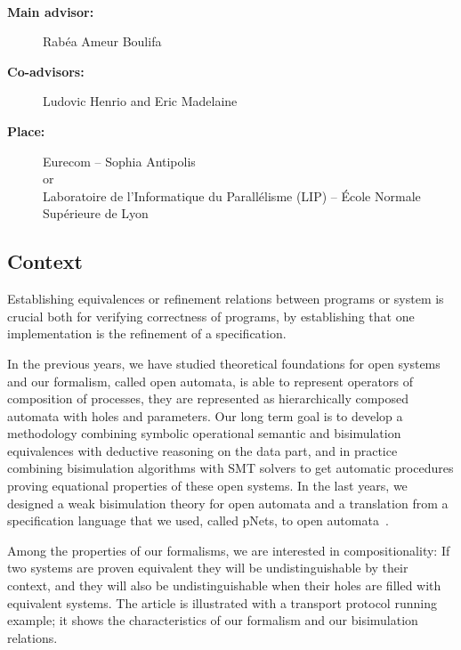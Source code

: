 \documentclass[11pt,fleqn]{article}
\begin{document}
\begin{center}
\\\bigskip
{}
\end{center}
\medskip

\begin{description}
\item[\bf Main advisor:] Rabéa Ameur Boulifa 
\item[\bf Co-advisors:] Ludovic Henrio and Eric Madelaine
\item[\bf Place:] Eurecom  -- Sophia Antipolis
\\
or\\
Laboratoire de l'Informatique du Parallélisme (LIP) --
  \'Ecole Normale Supérieure de Lyon
\end{description}

\subsection*{Context}


Establishing equivalences or refinement relations between programs or system is crucial both for verifying correctness of programs, by establishing that one implementation is the refinement of a specification. 

In the previous years, we have studied theoretical foundations for open
systems and our formalism, called open automata, is able to represent operators of composition of processes, 
they are represented
as hierarchically composed automata with holes and parameters. 
Our long 
term goal is to 
develop a methodology combining symbolic operational semantic and bisimulation 
equivalences with deductive reasoning on the data part, 
and in practice combining bisimulation algorithms with SMT solvers to get automatic 
procedures proving equational properties
of these open systems. In the last years, we designed a weak bisimulation theory for  open automata and a translation from a specification language that we used, called pNets, to open automata~\cite{arxiv-weakbisim}.


Among the properties of our formalisms, we are interested in compositionality: If two systems are proven equivalent they will be undistinguishable by their context, and they will also be undistinguishable when their holes are filled with equivalent systems.
The article is illustrated with a transport protocol running example; it shows the characteristics of our formalism and our bisimulation relations.
\end{document}
